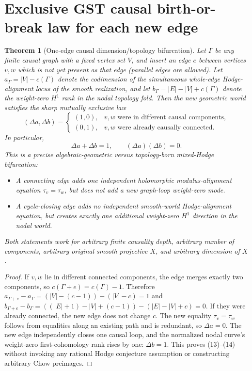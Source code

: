 \documentclass[11pt]{article}
\newtheorem{theorem}{Theorem}
\begin{document}
\section{Exclusive GST causal birth-or-break law for each new edge}
\begin{theorem}[One-edge causal dimension/topology bifurcation]
Let $\Gamma$ be \emph{any} finite causal graph
with a fixed vertex set $V$, and insert an edge $e$
between vertices $v,w$ which is not yet present
as that edge (parallel edges are allowed).
Let $a_\Gamma=|V|-c(\Gamma)$ denote the codimension
of the simultaneous whole-edge Hodge-alignment
locus of the \emph{smooth} realization, and
let $b_\Gamma=|E|-|V|+c(\Gamma)$ denote the
weight-zero $H^1$ rank in the \emph{nodal topology fold}.
Then the new geometric world satisfies the sharp
mutually exclusive law
\[
 \boxed{
 (\Delta a,\Delta b)=
 \begin{cases}
 (1,0), & v,w\text{ were in different causal components},\\
 (0,1), & v,w\text{ were already causally connected}.
 \end{cases}
 }                                                              \tag{13}
\]
In particular,
\[
 \boxed{\Delta a+\Delta b=1,\qquad
       (\Delta a)(\Delta b)=0.}                                 \tag{14}
\]
This is a precise algebraic-geometric versus
topology-born mixed-Hodge \emph{bifurcation}:
\begin{itemize}
\item A connecting edge adds one independent
  holomorphic modulus-alignment equation
  $\tau_v=\tau_w$, but does not add a new
  graph-loop weight-zero mode.
\item A cycle-closing edge adds no independent
  smooth-world Hodge-alignment equation, but
  creates exactly one additional
  weight-zero $H^1$ direction in the nodal world.
\end{itemize}
Both statements work for arbitrary finite causality
depth, arbitrary number of components, arbitrary
original smooth projective $X$, and arbitrary
dimension of $X$.
\end{theorem}
\begin{proof}
If $v,w$ lie in different connected components,
the edge merges exactly two components, so
$c(\Gamma+e)=c(\Gamma)-1$.
Therefore
$a_{\Gamma+e}-a_\Gamma=
 (|V|-(c-1))-(|V|-c)=1$
and
$b_{\Gamma+e}-b_\Gamma=
 ((|E|+1)-|V|+(c-1))-(|E|-|V|+c)=0$.
If they were already connected, the new edge
does not change $c$. The new equality
$\tau_v=\tau_w$ follows from equalities along
an existing path and is redundant, so
$\Delta a=0$.
The new edge independently closes one
causal loop, and the normalized nodal curve's
weight-zero first-cohomology rank rises by one:
$\Delta b=1$. This proves (13)--(14)
without invoking any rational Hodge conjecture
assumption or constructing arbitrary Chow preimages.
\end{proof}
\end{document}
